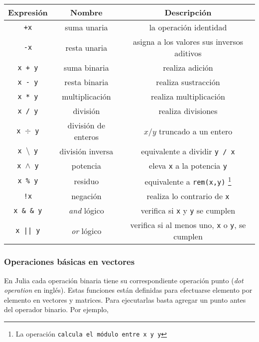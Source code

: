 \begin{center}
	\begin{longtable}{|c|c|c|} 
		\hline
		Expresión & Nombre & Descripción \\ 
		\hline 
		\texttt{+x} & suma unaria & la operación identidad \\ 

		\texttt{-x} & resta unaria & asigna a los valores sus inversos aditivos \\ 

		\texttt{x + y} & suma binaria & realiza adición \\ 

		\texttt{x - y} & resta binaria & realiza sustracción \\

		\texttt{x * y} & multiplicación & realiza multiplicación \\

		\texttt{x / y} & división & realiza divisiones \\

		\texttt{x $\div$ y} & división de enteros & $x / y$ truncado a un entero \\

		\texttt{x $\setminus$ y} & división inversa & equivalente a dividir \texttt{y / x} \\

		\texttt{x $\wedge$ y} & potencia & eleva \texttt{x} a la potencia \texttt{y} \\

		\texttt{x \% y} & residuo & equivalente a \texttt{rem(x,y)} \footnote{La operación \texttt{calcula el módulo entre \texttt{x} y \texttt{y}}} \\
		
		\texttt{!x} & negación & realiza lo contrario de \texttt{x} \\
		
		\texttt{x \& \& y} & \textit{and} lógico & verifica si \texttt{x} y \texttt{y} se cumplen \\
		
		\texttt{x || y} & \textit{or} lógico & verifica si al menos uno, \texttt{x} o \texttt{y},  se cumplen \\
		\hline
	\end{longtable} 
	 \label{operaciones_basicas_julia}
\end{center}


\subsubsection{Operaciones básicas en vectores}
En \textsf{Julia} cada operación binaria tiene su correspondiente operación punto (\textit{dot operation} en inglés). Estas funciones están definidas para efectuarse elemento por elemento en vectores y matrices. Para ejecutarlas basta agregar un punto antes del operador binario. Por ejemplo,


